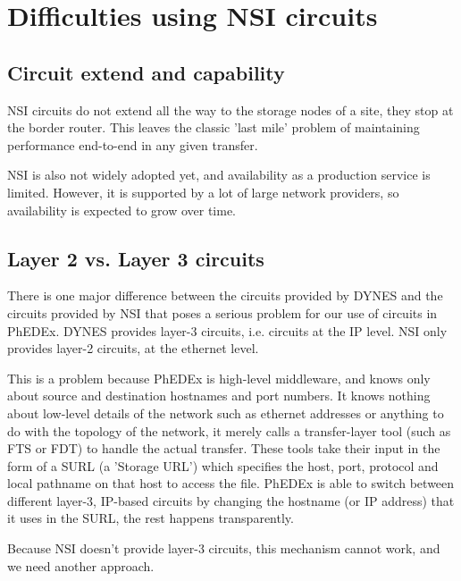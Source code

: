 \section{Difficulties using NSI circuits}

\subsection{Circuit extend and capability}
NSI circuits do not extend all the way to the storage nodes of a site, they stop at the border router. This leaves the classic 'last mile' problem of maintaining performance end-to-end in any given transfer.

NSI is also not widely adopted yet, and availability as a production service is limited. However, it is supported by a lot of large network providers, so availability is expected to grow over time.

\subsection{Layer 2 vs. Layer 3 circuits}

There is one major difference between the circuits provided by DYNES and the circuits provided by NSI that poses a serious problem for our use of circuits in PhEDEx. DYNES provides layer-3 circuits, i.e. circuits at the IP level. NSI only provides layer-2 circuits, at the ethernet level.

This is a problem because PhEDEx is high-level middleware, and knows only about source and destination hostnames and port numbers. It knows nothing about low-level details of the network such as ethernet addresses or anything to do with the topology of the network, it merely calls a transfer-layer tool (such as FTS\cite{FTS} or FDT\cite{FDT}) to handle the actual transfer. These tools take their input in the form of a SURL (a 'Storage URL') which specifies the host, port, protocol and local pathname on that host to access the file. PhEDEx is able to switch between different layer-3, IP-based circuits by changing the hostname (or IP address) that it uses in the SURL, the rest happens transparently.

Because NSI doesn't provide layer-3 circuits, this mechanism cannot work, and we need another approach.